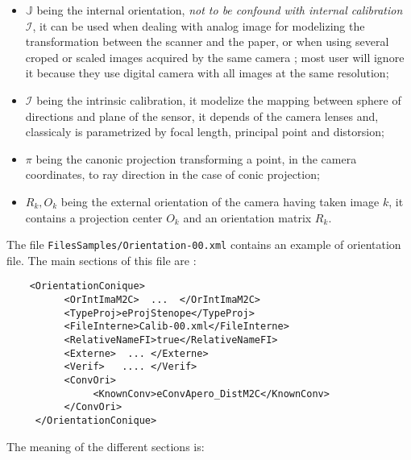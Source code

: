 \begin{itemize}
  \item  $\mathbb{J}$   being the internal orientation, \emph{not to be confound with internal calibration}
         $\mathcal{I}$, it can be used when dealing with analog image for modelizing the transformation
         between the scanner and the paper, or when using several croped or scaled images acquired by the same
         camera ; most user will ignore it because they use digital camera with all images at the same resolution;

  \item  $\mathcal{I}$ being the intrinsic calibration, it modelize the mapping between sphere of directions and
        plane of the sensor, it depends of the camera lenses and, classicaly is parametrized by
         focal length, principal point and distorsion;

  \item  $\pi$ being the canonic projection transforming a point, in the camera coordinates, to ray direction in the
         case of conic projection;

  \item  $R_k,O_k$ being the external orientation of the camera having taken image $k$, it contains a projection
         center $O_k$ and an orientation matrix $R_k$.
\end{itemize}

The file {\tt FilesSamples/Orientation-00.xml} contains an example of orientation
file. The main sections of this file are :

{\scriptsize
\begin{verbatim}
    <OrientationConique>
          <OrIntImaM2C>  ...  </OrIntImaM2C>
          <TypeProj>eProjStenope</TypeProj>
          <FileInterne>Calib-00.xml</FileInterne>
          <RelativeNameFI>true</RelativeNameFI>
          <Externe>  ... </Externe>
          <Verif>   .... </Verif>
          <ConvOri>
               <KnownConv>eConvApero_DistM2C</KnownConv>
          </ConvOri>
     </OrientationConique>
\end{verbatim}
}

The meaning of the different sections is:

